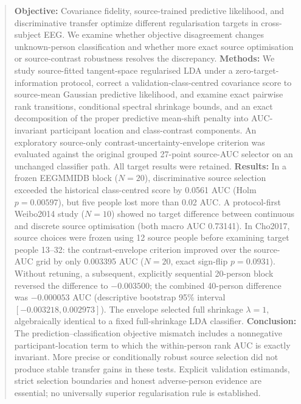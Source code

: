 \begin{abstract}
\textbf{Objective:}
Covariance fidelity, source-trained predictive likelihood, and
discriminative transfer optimize different regularisation targets in
cross-subject EEG. We examine whether objective disagreement changes
unknown-person classification and whether more exact source
optimisation or source-contrast robustness resolves the discrepancy.
\textbf{Methods:}
We study source-fitted tangent-space regularised LDA under a
zero-target-information protocol, correct a validation-class-centred
covariance score to source-mean Gaussian predictive likelihood,
and examine exact pairwise rank transitions, conditional
spectral shrinkage bounds, and an exact decomposition of the
proper predictive mean-shift penalty into AUC-invariant
participant location and class-contrast components. An exploratory source-only
contrast-uncertainty-envelope criterion was evaluated against
the original grouped 27-point source-AUC selector on an
unchanged classifier path. All target results were retained.
\textbf{Results:}
In a frozen EEGMMIDB block ($N=20$), discriminative source
selection exceeded the historical class-centred score by
0.0561 AUC (Holm $p=0.00597$), but five people lost more
than 0.02 AUC. A protocol-first Weibo2014 study ($N=10$)
showed no target difference between continuous and discrete
source optimisation (both macro AUC 0.73141).
In Cho2017, source choices were frozen using 12 source people
before examining target people 13--32: the contrast-envelope
criterion improved over the source-AUC grid by only
0.003395 AUC ($N=20$, exact sign-flip $p=0.0931$).
Without retuning, a subsequent, explicitly sequential
20-person block reversed the difference to $-0.003500$;
the combined 40-person difference was $-0.000053$ AUC
(descriptive bootstrap 95\% interval
$[-0.003218,0.002973]$). The envelope selected
full shrinkage $\lambda=1$, algebraically identical to a fixed
full-shrinkage LDA classifier.
\textbf{Conclusion:}
The prediction--classification objective mismatch includes
a nonnegative participant-location term to which the
within-person rank AUC is exactly invariant. More precise or
conditionally robust source selection did not produce stable
transfer gains in these tests. Explicit
validation estimands, strict selection boundaries and
honest adverse-person evidence are essential; no universally
superior regularisation rule is established.
\end{abstract}
